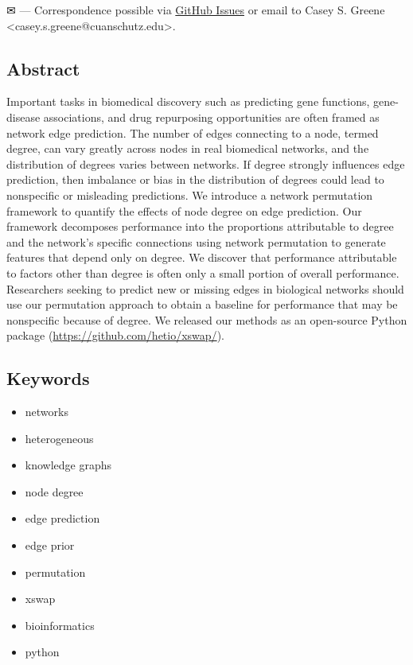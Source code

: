 \leavevmode{}%
✉ --- Correspondence possible via \href{https://github.com/greenelab/xswap-manuscript/issues}{GitHub Issues}
or email to
Casey S. Greene \textless casey.s.greene@cuanschutz.edu\textgreater.

\hypertarget{abstract}{%
\subsection{Abstract}\label{abstract}}

Important tasks in biomedical discovery such as predicting gene functions, gene-disease associations, and drug repurposing opportunities are often framed as network edge prediction.
The number of edges connecting to a node, termed degree, can vary greatly across nodes in real biomedical networks, and the distribution of degrees varies between networks.
If degree strongly influences edge prediction, then imbalance or bias in the distribution of degrees could lead to nonspecific or misleading predictions.
We introduce a network permutation framework to quantify the effects of node degree on edge prediction.
Our framework decomposes performance into the proportions attributable to degree and the network's specific connections using network permutation to generate features that depend only on degree.
We discover that performance attributable to factors other than degree is often only a small portion of overall performance.
Researchers seeking to predict new or missing edges in biological networks should use our permutation approach to obtain a baseline for performance that may be nonspecific because of degree.
We released our methods as an open-source Python package (\url{https://github.com/hetio/xswap/}).

\hypertarget{keywords}{%
\subsection{Keywords}\label{keywords}}

\begin{itemize}
\tightlist
\item
  networks
\item
  heterogeneous
\item
  knowledge graphs
\item
  node degree
\item
  edge prediction
\item
  edge prior
\item
  permutation
\item
  xswap
\item
  bioinformatics
\item
  python
\end{itemize}

